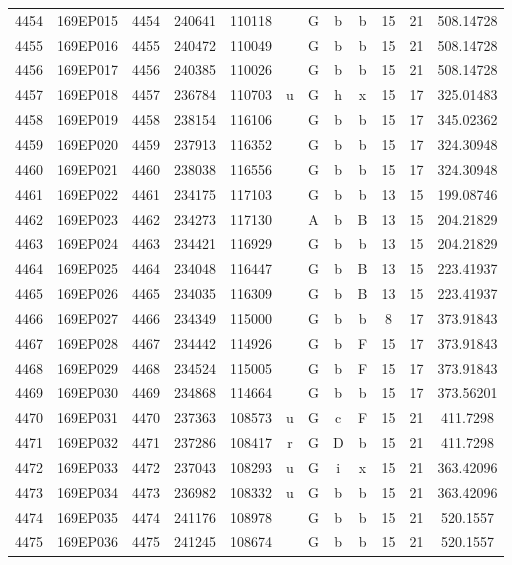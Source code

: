 \begin{tabular}{|*{12}{c|}}
4454 & 169EP015 & 4454 & 240641 & 110118 &  & G & b & b & 15 & 21 & 508.14728 \\ 
4455 & 169EP016 & 4455 & 240472 & 110049 &  & G & b & b & 15 & 21 & 508.14728 \\ 
4456 & 169EP017 & 4456 & 240385 & 110026 &  & G & b & b & 15 & 21 & 508.14728 \\ 
4457 & 169EP018 & 4457 & 236784 & 110703 & u & G & h & x & 15 & 17 & 325.01483 \\ 
4458 & 169EP019 & 4458 & 238154 & 116106 &  & G & b & b & 15 & 17 & 345.02362 \\ 
4459 & 169EP020 & 4459 & 237913 & 116352 &  & G & b & b & 15 & 17 & 324.30948 \\ 
4460 & 169EP021 & 4460 & 238038 & 116556 &  & G & b & b & 15 & 17 & 324.30948 \\ 
4461 & 169EP022 & 4461 & 234175 & 117103 &  & G & b & b & 13 & 15 & 199.08746 \\ 
4462 & 169EP023 & 4462 & 234273 & 117130 &  & A & b & B & 13 & 15 & 204.21829 \\ 
4463 & 169EP024 & 4463 & 234421 & 116929 &  & G & b & b & 13 & 15 & 204.21829 \\ 
4464 & 169EP025 & 4464 & 234048 & 116447 &  & G & b & B & 13 & 15 & 223.41937 \\ 
4465 & 169EP026 & 4465 & 234035 & 116309 &  & G & b & B & 13 & 15 & 223.41937 \\ 
4466 & 169EP027 & 4466 & 234349 & 115000 &  & G & b & b & 8 & 17 & 373.91843 \\ 
4467 & 169EP028 & 4467 & 234442 & 114926 &  & G & b & F & 15 & 17 & 373.91843 \\ 
4468 & 169EP029 & 4468 & 234524 & 115005 &  & G & b & F & 15 & 17 & 373.91843 \\ 
4469 & 169EP030 & 4469 & 234868 & 114664 &  & G & b & b & 15 & 17 & 373.56201 \\ 
4470 & 169EP031 & 4470 & 237363 & 108573 & u & G & c & F & 15 & 21 & 411.7298 \\ 
4471 & 169EP032 & 4471 & 237286 & 108417 & r & G & D & b & 15 & 21 & 411.7298 \\ 
4472 & 169EP033 & 4472 & 237043 & 108293 & u & G & i & x & 15 & 21 & 363.42096 \\ 
4473 & 169EP034 & 4473 & 236982 & 108332 & u & G & b & b & 15 & 21 & 363.42096 \\ 
4474 & 169EP035 & 4474 & 241176 & 108978 &  & G & b & b & 15 & 21 & 520.1557 \\ 
4475 & 169EP036 & 4475 & 241245 & 108674 &  & G & b & b & 15 & 21 & 520.1557 \\ 

\end{tabular}
